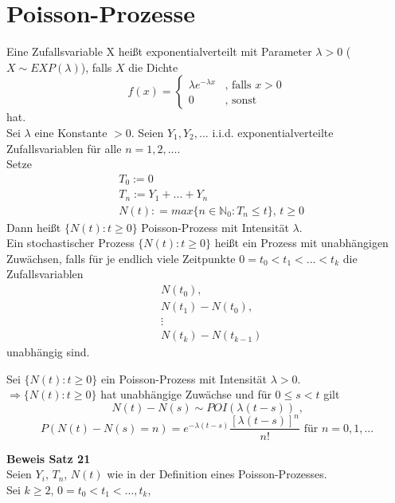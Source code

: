 \documentclass[a4paper,12pt]{article}
\begin{document}
\section{Poisson-Prozesse}
Eine Zufallsvariable X heißt exponentialverteilt mit Parameter $\lambda > 0$ ($X \sim EXP(\lambda)$), falls $X$ die Dichte
$$
	f(x) =
	\begin{cases}
		\lambda e ^{-\lambda x} & \text{, falls } x > 0 \\
		0                       & \text{, sonst}
	\end{cases}
$$
hat.\\
Sei $\lambda$ eine Konstante $>0$. Seien $Y_1, Y_2, ...$ i.i.d. exponentialverteilte Zufallsvariablen für alle $n=1,2,...$.\\
Setze
\begin{align*}
	 & T_0:= 0                                                         \\
	 & T_n:= Y_1 + ... + Y_n                                           \\
	 & N(t): = max\{n \in \mathbb{N}_0:T_n \leq t\} \text{, } t \geq 0
\end{align*}
Dann heißt $\{N(t):t \geq 0\}$ Poisson-Prozess mit Intensität $\lambda$.\\
Ein stochastischer Prozess $\{N(t): t \geq 0\}$ heißt ein Prozess mit unabhängigen
Zuwächsen, falls für je endlich viele Zeitpunkte
$
	0 = t_0 < t_1 < ... < t_k
$ die Zufallsvariablen
\begin{align*}
	 & N(t_0),             \\
	 & N(t_1) - N(t_0),    \\
	 & \vdots              \\
	 & N(t_k) - N(t_{k-1})
\end{align*}
unabhängig sind.\\
\begin{tcolorbox}[breakable, colframe=green, colback=white, title=Satz 21]
	Sei $\{N(t):t \geq 0\}$ ein Poisson-Prozess mit Intensität $\lambda > 0$.\\
	$\Rightarrow \{N(t):t \geq 0\}$ hat unabhängige Zuwächse und für
	$0 \leq s < t$ gilt
	$$
		N(t) - N(s) \sim POI(\lambda(t-s)) \text{ ,}
	$$
	$$
		P(N(t) - N(s) = n) = e^{-\lambda(t-s)} \frac{[\lambda(t-s)]^n}{n!} \text{ für } n=0,1,...
	$$
\end{tcolorbox}
\textbf{Beweis Satz 21}\\
Seien $Y_i$, $T_n$, $N(t)$ wie in der Definition eines Poisson-Prozesses.\\
Sei $k \geq 2$, $0 = t_0 < t_1 < ..., t_k$,
\end{document}
